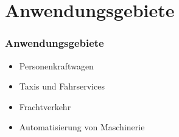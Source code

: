 \section{Anwendungsgebiete}

\begin{frame}
    \frametitle{Anwendungsgebiete}
    
    \begin{itemize}
        \item Personenkraftwagen \pause
        \item Taxis und Fahrservices \pause
        \item Frachtverkehr \pause
        \item Automatisierung von Maschinerie
    \end{itemize}
\end{frame}